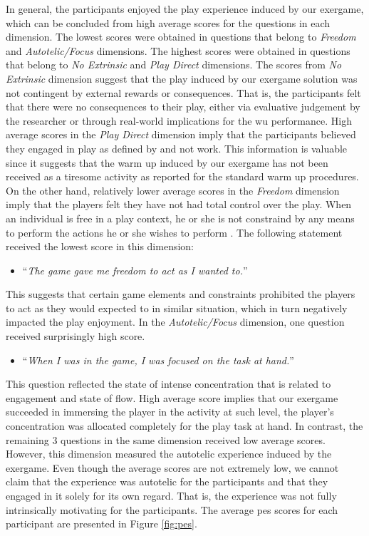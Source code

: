 In general, the participants enjoyed the play experience induced by our exergame, which can be concluded from high average scores for the questions in each dimension. The lowest scores were obtained in questions that belong to \textit{Freedom} and \textit{Autotelic/Focus} dimensions. The highest scores were obtained in questions that belong to \textit{No Extrinsic} and \textit{Play Direct} dimensions. The scores from \textit{No Extrinsic} dimension suggest that the play induced by our exergame solution was not contingent by external rewards or consequences. That is, the participants felt that there were no consequences to their play, either via evaluative judgement by the researcher or through real-world implications for the \acrshort{wu} performance. High average scores in the \textit{Play Direct} dimension imply that the participants believed they engaged in play as defined by \cite{pavlas2012play} and not work. This information is valuable since it suggests that the warm up induced by our exergame has not been received as a tiresome activity as reported for the standard warm up procedures. On the other hand, relatively lower average scores in the \textit{Freedom} dimension imply that the players felt they have not had total control over the play. When an individual is free in a play context, he or she is not constraind by any means to perform the actions he or she wishes to perform \cite{pavlas2012play}. The following statement received the lowest score in this dimension: 
\begin{itemize}
\item ``\textit{The game gave me freedom to act as I wanted to.}''
\end{itemize} This suggests that certain game elements and constraints prohibited the players to act as they would expected to in similar situation, which in turn negatively impacted the play enjoyment.  In the \textit{Autotelic/Focus} dimension, one question received surprisingly high score.  
\begin{itemize}
\item ``\textit{When I was in the game, I was focused on the task at hand.}''
\end{itemize} This question reflected the state of intense concentration that is related to engagement and state of flow. High average score implies that our exergame succeeded in immersing the player in the activity at such  level, the player's concentration was allocated completely for the play task at hand.  In contrast, the remaining 3 questions in the same dimension received low average scores. However, this dimension measured the autotelic experience induced by the exergame.  Even though the average scores are not extremely low, we cannot claim that the experience was autotelic for the participants and that they engaged in it solely for its own regard. That is, the experience was not fully intrinsically motivating for the participants. The average \gls{pes} scores for each participant are presented in Figure \ref{fig:pes}.
